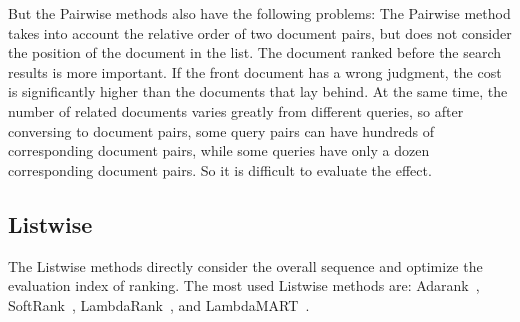 But the Pairwise methods also have the following problems: 
The Pairwise method takes into account the relative order of two document pairs, but does not consider the position of the document in the list. The document ranked before the search results is more important. If the front document has a wrong judgment, the cost is significantly higher than the documents that lay behind.
At the same time, the number of related documents varies greatly from different queries, so after conversing to document pairs, some query pairs can have hundreds of corresponding document pairs, while some queries have only a dozen corresponding document pairs. So it is difficult to evaluate the effect.

\subsection{Listwise}
The Listwise methods directly consider the overall sequence and optimize the evaluation index of ranking. The most used Listwise methods are: Adarank~\cite{xu2007adarank}, SoftRank~\cite{taylor2008softrank}, LambdaRank~\cite{burges2007learning}, and LambdaMART~\cite{burges2010ranknet}.

